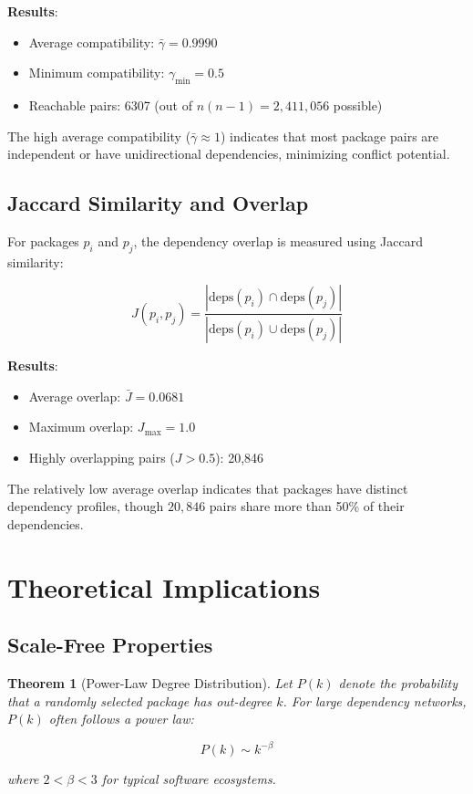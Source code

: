 \documentclass[11pt,a4paper]{article}
\newtheorem{theorem}{Theorem}
\begin{document}
\textbf{Results}:
\begin{itemize}
\item Average compatibility: $\bar{\gamma} = 0.9990$
\item Minimum compatibility: $\gamma_{\min} = 0.5$
\item Reachable pairs: 6307 (out of $n(n-1) = 2{,}411{,}056$ possible)
\end{itemize}

The high average compatibility ($\bar{\gamma} \approx 1$) indicates that most package pairs are independent or have unidirectional dependencies, minimizing conflict potential.

\subsection{Jaccard Similarity and Overlap}

For packages $p_i$ and $p_j$, the dependency overlap is measured using Jaccard similarity:

\begin{equation}
J(p_i, p_j) = \frac{|\text{deps}(p_i) \cap \text{deps}(p_j)|}{|\text{deps}(p_i) \cup \text{deps}(p_j)|}
\end{equation}

\textbf{Results}:
\begin{itemize}
\item Average overlap: $\bar{J} = 0.0681$
\item Maximum overlap: $J_{\max} = 1.0$
\item Highly overlapping pairs ($J > 0.5$): 20{,}846
\end{itemize}

The relatively low average overlap indicates that packages have distinct dependency profiles, though $20{,}846$ pairs share more than 50\% of their dependencies.

\section{Theoretical Implications}

\subsection{Scale-Free Properties}

\begin{theorem}[Power-Law Degree Distribution]
Let $P(k)$ denote the probability that a randomly selected package has out-degree $k$. For large dependency networks, $P(k)$ often follows a power law:

\begin{equation}
P(k) \sim k^{-\beta}
\end{equation}

where $2 < \beta < 3$ for typical software ecosystems.
\end{theorem}
\end{document}
